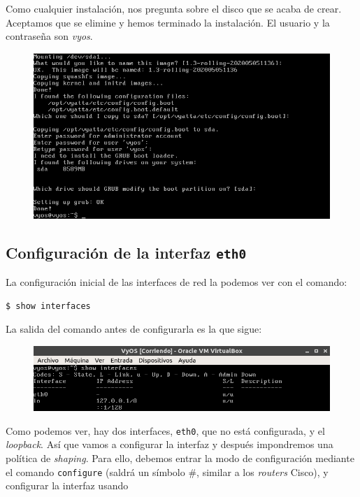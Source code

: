 \documentclass[11pt,a4paper]{article}
\begin{document}
Como cualquier instalación, nos pregunta sobre el disco que se acaba de crear. Aceptamos que se elimine y hemos terminado la instalación. El usuario y la contraseña son \textit{vyos}.

\begin{figure}[H]
	\centering
	\includegraphics[scale=0.3]{img/sda-fin.png}
\end{figure}

\subsection{Configuración de la interfaz \texttt{eth0}}

La configuración inicial de las interfaces de red la podemos ver con el comando:\\

\begin{lstlisting}[language=bash]
$ show interfaces
\end{lstlisting}

\vspace{0.3cm} La salida del comando antes de configurarla es la que sigue:

\begin{figure}[H]
	\centering
	\includegraphics[scale=0.5]{img/show-init-interfaces.png}
\end{figure}

Como podemos ver, hay dos interfaces, \texttt{eth0}, que no está configurada, y el \textit{loopback}. Así que vamos a configurar la interfaz y después impondremos una política de \textit{shaping}. Para ello, debemos entrar la modo de configuración mediante el comando \texttt{configure} (saldrá un símbolo \#, similar a los \textit{routers} Cisco), y configurar la interfaz usando\\
\end{document}
